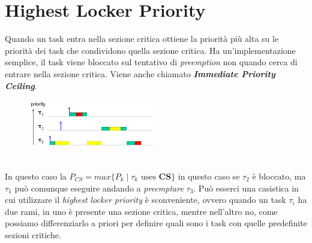 \section{Highest Locker Priority}
Quando un task entra nella sezione critica ottiene la priorità più alta su le priorità dei task che condividono quella sezione critica. Ha un'implementazione semplice, il task viene bloccato sul tentativo di \textit{preemption} non quando cerca di entrare nella sezione critica. Viene anche chiamato \textbf{\textit{Immediate Priority Ceiling}}.
\begin{figure}[h]
    \centering
    \includegraphics[width=0.5\textwidth]{img/hlp}
\end{figure}
\\
In questo caso la $P_{CS} = max\{P_k \; | \; \tau_k \text{ uses } \mathbf{CS}\}$ in questo caso se $\tau_2$ è bloccato, ma $\tau_1$ può comunque eseguire andando a \textit{preemptare} $\tau_3$. Può esserci una casistica in cui utilizzare il \textit{highest locker priority} è sconveniente, ovvero quando un task $\tau_i$ ha due rami, in uno è presente una sezione critica, mentre nell'altro no, come possiamo differenziarlo a priori per definire quali sono i task con quelle predefinite sezioni critiche.


